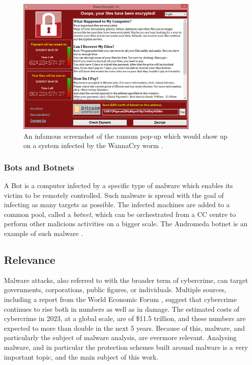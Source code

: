 \begin{figure}[ht]
    \centering
    \includegraphics[width=0.8\textwidth]{./images/wanacry.png}
    \caption{An infamous screenshot of the ransom pop-up which would show up on a system infected by the WannaCry worm \cite{wiki_wannacry}.}
    \label{fig:wannacry}
\end{figure}

\subsubsection{Bots and Botnets}

A Bot is a computer infected by a specific type of malware which enables its victim to be remotely controlled. Such malware is spread with the goal of infecting as many targets as possible. The infected machines are added to a common pool, called a \emph{botnet}, which can be orchestrated from a \gls{CC} centre to perform other malicious activities on a bigger scale. The Andromeda botnet is an example of such malware \cite{andromeda} \cite{kaspersky_malware_types}.

\subsection{Relevance}

Malware attacks, also referred to with the broader term of cybercrime, can target governments, corporations, public figures, or individuals. Multiple sources, including a report from the World Economic Forum \cite{wef_cybercrime}, suggest that cybercrime continues to rise both in numbers as well as in damage. The estimated costs of cybercrime in 2023, at a global scale, are of \$11.5 trillion, and these numbers are expected to more than double in the next 5 years. Because of this, malware, and particularly the subject of malware analysis, are evermore relevant. Analysing malware, and in particular the protection schemes built around malware is a very important topic, and the main subject of this work.

